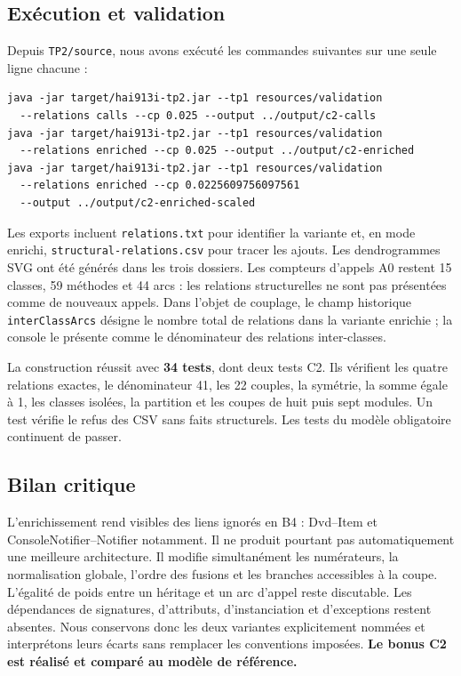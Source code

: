 \documentclass[11pt,a4paper]{article}
\begin{document}
\subsection{Exécution et validation}
Depuis \texttt{TP2/source}, nous avons exécuté les commandes suivantes sur
une seule ligne chacune :
\begin{verbatim}
java -jar target/hai913i-tp2.jar --tp1 resources/validation
  --relations calls --cp 0.025 --output ../output/c2-calls
java -jar target/hai913i-tp2.jar --tp1 resources/validation
  --relations enriched --cp 0.025 --output ../output/c2-enriched
java -jar target/hai913i-tp2.jar --tp1 resources/validation
  --relations enriched --cp 0.0225609756097561
  --output ../output/c2-enriched-scaled
\end{verbatim}
Les exports incluent \texttt{relations.txt} pour identifier la variante et,
en mode enrichi, \texttt{structural-relations.csv} pour tracer les ajouts.
Les dendrogrammes SVG ont été générés dans les trois dossiers.
Les compteurs d'appels A0 restent 15 classes, 59 méthodes et 44 arcs : les
relations structurelles ne sont pas présentées comme de nouveaux appels.
Dans l'objet de couplage, le champ historique \texttt{interClassArcs}
désigne le nombre total de relations dans la variante enrichie ; la console
le présente comme le dénominateur des relations inter-classes.

La construction réussit avec \textbf{34 tests}, dont deux tests C2. Ils
vérifient les quatre relations exactes, le dénominateur 41, les 22 couples,
la symétrie, la somme égale à 1, les classes isolées, la partition et les
coupes de huit puis sept modules. Un test vérifie le refus des CSV sans
faits structurels. Les tests du modèle obligatoire continuent de passer.

\subsection{Bilan critique}
L'enrichissement rend visibles des liens ignorés en B4 : Dvd--Item et
ConsoleNotifier--Notifier notamment. Il ne produit pourtant pas automatiquement
une meilleure architecture. Il modifie simultanément les numérateurs, la
normalisation globale, l'ordre des fusions et les branches accessibles à la
coupe. L'égalité de poids entre un héritage et un arc d'appel reste discutable.
Les dépendances de signatures, d'attributs, d'instanciation et d'exceptions
restent absentes. Nous conservons donc les deux variantes explicitement
nommées et interprétons leurs écarts sans remplacer les conventions imposées.
\textbf{Le bonus C2 est réalisé et comparé au modèle de référence.}
\end{document}
